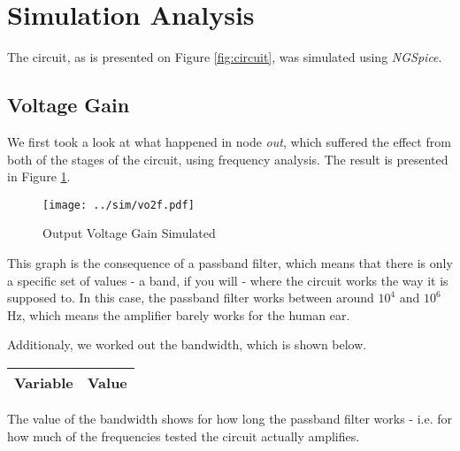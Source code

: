 \clearpage

\section{Simulation Analysis}
\label{sec:simulation}

The circuit, as is presented on Figure \ref{fig:circuit}, was simulated using \textit{NGSpice}.

\vspace{-0.2cm}

\subsection{Voltage Gain}

We first took a look at what happened in node \textit{out}, which suffered the effect from both of the stages of the circuit, using frequency analysis. The result is presented in Figure \ref{fig:vo2f}.

\vspace{-3cm}

\begin{figure}[h] \centering
\texttt{[image: ../sim/vo2f.pdf]}
\caption{Output Voltage Gain Simulated}
\label{fig:vo2f}
\end{figure}

This graph is the consequence of a passband filter, which means that there is only a specific set of values - a band, if you will - where the circuit works the way it is supposed to. In this case, the passband filter works between around $10^4$ and $10^6$ Hz, which means the amplifier barely works for the human ear.

Additionaly, we worked out the bandwidth, which is shown below.

\vspace{0.4cm}

\begin{center}
\begin{tabular}{|l|r|}
  \hline    
  {\bf Variable} & {\bf Value} \\ \hline
  
\end{tabular}
\end{center}

\vspace{0.4cm}

The value of the bandwidth shows for how long the passband filter works - i.e. for how much of the frequencies tested the circuit actually amplifies.



